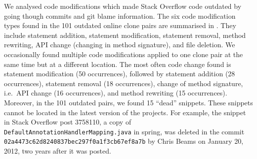 \documentclass[10pt,journal,compsoc]{IEEEtran}
\begin{document}
We analysed code modifications which made Stack Overflow code outdated by going
though commits and git blame information. The six code modification
types found in the 101 outdated online clone pairs are summarised in
. They include statement addition, statement modification,
statement removal, method rewriting, API change (changing in method signature),
and file deletion. We occasionally found multiple code modifications applied to
one clone pair at the same time but at a different location. The most often code
change found is statement modification (50 occurrences), followed by statement
addition (28 occurrences), statement removal (18 occurrences), change of
method signature, i.e.~API change (16 occurrences), and method rewriting (15
occurrences). Moreover, in the 101 outdated pairs, we found 15 ``dead''
snippets. These snippets cannot be located in the latest version of the
projects. For example, the snippet in Stack Overflow post 3758110, a copy of
{\small{\texttt{DefaultAnnotationHandlerMapping.java}}} in \textsf{spring}, was
deleted in the commit
{\small{\texttt{02a4473c62d8240837bec297f0a1f3cb67ef8a7b}}} by Chris Beams on
January 20, 2012, two years after it was posted.
\end{document}
